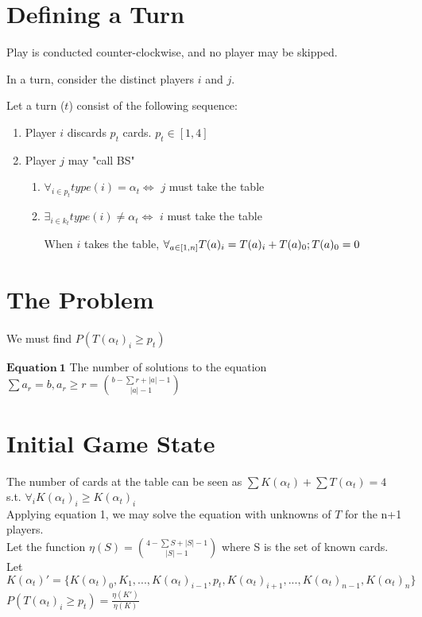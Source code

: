 \documentclass[a4paper,11pt]{article}
\begin{document}
\begin{description}
    \section{Defining a Turn}
    \item Play is conducted counter-clockwise, and no player may be skipped.
    \item In a turn, consider the distinct players $i$ and $j$.
    \item Let a turn ($t$) consist of the following sequence:
    \begin{enumerate}
        \item Player $i$ discards $p_t$ cards. $p_t \in [1,4]$
        \item Player $j$ may "call BS"
        \begin{enumerate}
            \item $\forall_{i\in p_t} type(i) = \alpha_t \iff $ $j$ must take the table
            \item $\exists_{i\in k_t} type(i) \neq \alpha_t \iff $ $i$ must take the table
            
            \subitem When $i$ takes the table, $\forall_{a \in [1, n]} \\ T(a)_i = T(a)_i + T(a)_0; T(a)_0 = 0$
        \end{enumerate}
    \end{enumerate}
    \section{The Problem}
    \paragraph{} We must find $P(T(\alpha_t)_{i} \geq p_t)$

\end{description}

$\mathbf{Equation~1}$ The number of solutions to the equation $\sum {a_r} = b, a_r \geq r = {{b - \sum r + |a| - 1}\choose{|a| - 1}}$\\
\section{Initial Game State}
The number of cards at the table can be seen as $\sum K(\alpha_t) + \sum T(\alpha_t) = 4$\\ s.t. $\forall_i K(\alpha_t)_i \geq K(\alpha_t)_i$\\
Applying equation 1, we may solve the equation with unknowns of $T$ for the n+1 players.\\
Let the function $\eta(S) = {{4-\sum S + |S| - 1}\choose{|S|-1}}$ where S is the set of known cards. %
\\
Let $K(\alpha_t)' = \{K(\alpha_t)_0, K_1, ... , K(\alpha_t)_{i-1}, p_t, K(\alpha_t)_{i+1}, ... , K(\alpha_t)_{n-1}, K(\alpha_t)_{n}\}$ \\ 
$P(T(\alpha_t)_{i} \geq p_t) = \frac{\eta(K')}{\eta(K)}$ 
\end{document}
